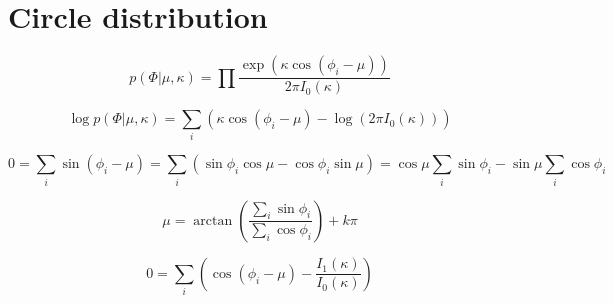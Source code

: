 \documentclass{article}
\DeclareMathOperator{\Reg}{Reg}
\begin{document}


\section*{Circle distribution}

\begin{equation}
    p(\Phi | \mu, \kappa) = \prod\frac{\exp(\kappa\cos(\phi_i - \mu))}{2\pi I_0(\kappa)}
\end{equation}

\begin{equation}
    \log p(\Phi | \mu, \kappa) = \sum\limits_i \left( \kappa\cos(\phi_i - \mu) - \log(2\pi I_0(\kappa)) \right)
\end{equation}

\begin{equation}
    0 = \sum\limits_i \sin(\phi_i - \mu) =
    \sum\limits_i \left( \sin\phi_i\cos\mu - \cos\phi_i\sin\mu \right) =
    \cos\mu\sum\limits_i \sin\phi_i - \sin\mu\sum\limits_i \cos\phi_i
\end{equation}

\begin{equation}
    \mu = \arctan\left( \frac{\sum\limits_i \sin\phi_i}{\sum\limits_i \cos\phi_i} \right) + k\pi
\end{equation}

\begin{equation}
    0 = \sum\limits_i \left( \cos(\phi_i - \mu) - \frac{I_1(\kappa)}{I_0(\kappa)} \right)
\end{equation}

\end{document}
